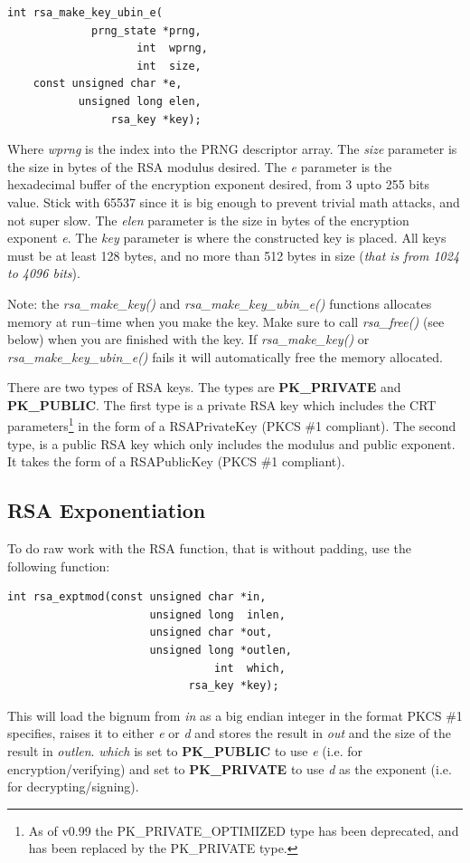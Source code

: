 \documentclass[synpaper]{book}
\begin{document}
\begin{verbatim}
int rsa_make_key_ubin_e(
             prng_state *prng,
                    int  wprng,
                    int  size,
    const unsigned char *e,
           unsigned long elen,
                rsa_key *key);
\end{verbatim}

Where \textit{wprng} is the index into the PRNG descriptor array.  The \textit{size} parameter is the size in bytes of the RSA modulus desired.
The \textit{e} parameter is the hexadecimal buffer of the encryption exponent desired, from 3 upto 255 bits value.  Stick with 65537 since it is big enough
to prevent trivial math attacks, and not super slow.  The \textit{elen} parameter is the size in bytes of the encryption exponent \textit{e}.
The \textit{key} parameter is where the constructed key is placed.  All keys must be at
least 128 bytes, and no more than 512 bytes in size (\textit{that is from 1024 to 4096 bits}).

Note: the \textit{rsa\_make\_key()} and \textit{rsa\_make\_key\_ubin\_e()} functions allocates memory at run--time when you make the key.
Make sure to call \textit{rsa\_free()} (see below) when you are finished with the key.  If \textit{rsa\_make\_key()} or \textit{rsa\_make\_key\_ubin\_e()}
fails it will automatically free the memory allocated.

 
There are two types of RSA keys.  The types are {\bf PK\_PRIVATE} and {\bf PK\_PUBLIC}.  The first type is a private
RSA key which includes the CRT parameters\footnote{As of v0.99 the PK\_PRIVATE\_OPTIMIZED type has been deprecated, and has been replaced by the
PK\_PRIVATE type.} in the form of a RSAPrivateKey (PKCS \#1 compliant).  The second type, is a public RSA key which only includes the modulus and public exponent.
It takes the form of a RSAPublicKey (PKCS \#1 compliant).

\subsection{RSA Exponentiation}
To do raw work with the RSA function, that is without padding, use the following function:
\begin{verbatim}
int rsa_exptmod(const unsigned char *in,
                      unsigned long  inlen,
                      unsigned char *out,
                      unsigned long *outlen,
                                int  which,
                            rsa_key *key);
\end{verbatim}
This will load the bignum from \textit{in} as a big endian integer in the format PKCS \#1 specifies, raises it to either \textit{e} or \textit{d} and stores the result
in \textit{out} and the size of the result in \textit{outlen}. \textit{which} is set to {\bf PK\_PUBLIC} to use \textit{e}
(i.e. for encryption/verifying) and set to {\bf PK\_PRIVATE} to use \textit{d} as the exponent (i.e. for decrypting/signing).
\end{document}
